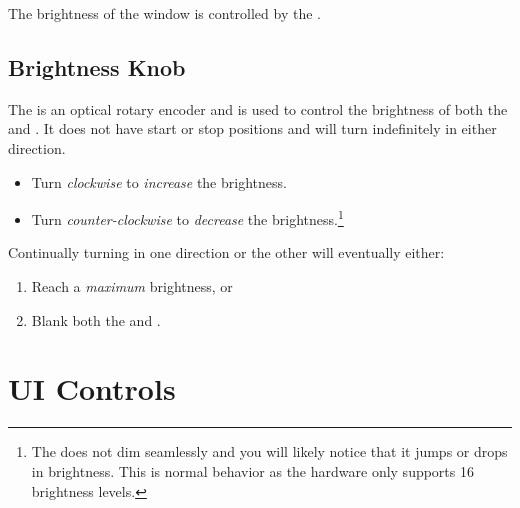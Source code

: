 \par\medskip

The brightness of the  window is controlled by the
\hyperref[Brightness Knob]{}.

\subsection{Brightness Knob} \label{Brightness Knob}

The  is an optical rotary encoder and is used to control the brightness
of both the \hyperref[Display]{} and \hyperref[Lighting]{}. It
does not have start or stop positions and will turn indefinitely in either
direction.

\begin{itemize}
  \item Turn \textit{clockwise} to \textit{increase} the brightness.
  \item Turn \textit{counter-clockwise} to \textit{decrease} the
    brightness.\footnote{ The  does not dim seamlessly and you will
    likely notice that it jumps or drops in brightness.  This is normal
    behavior as the hardware only supports \num{16} brightness levels.}
\end{itemize}

Continually turning in one direction or the other will eventually either:

\begin{enumerate}
  \item Reach a \textit{maximum} brightness, or
  \item Blank both the  and .
\end{enumerate}


\section{UI Controls}

